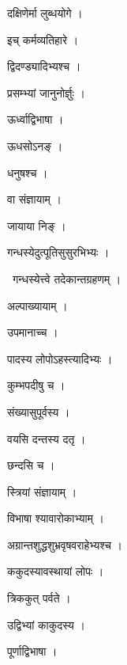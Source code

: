\documentclass[10pt, openany, oneside]{book}
\begin{document}
\noindent दक्षिणेर्मा लुब्धयोगे ।

\noindent इच् कर्मव्यतिहारे ।

\noindent द्विदण्ड्यादिभ्यश्च ।

\noindent प्रसम्भ्यां जानुनोर्ज्ञुः ।

\noindent ऊर्ध्वाद्विभाषा ।

\noindent ऊधसोऽनङ् ।

\noindent धनुषश्च ।

\noindent वा संज्ञायाम् ।

\noindent जायाया निङ् ।

\noindent गन्धस्येदुत्पूतिसुसुरभिभ्यः ।

\par\noindent\hspace{1.5em}{\vps वा॰}~{\qt गन्धस्येत्त्वे तदेकान्तग्रहणम् ।}

\noindent अल्पाख्यायाम् ।

\noindent उपमानाच्च ।

\noindent पादस्य लोपोऽहस्त्यादिभ्यः ।

\noindent कुम्भपदीषु च ।

\noindent संख्यासुपूर्वस्य ।

\noindent वयसि दन्तस्य दतृ ।

\noindent छन्दसि च ।

\noindent स्त्रियां संज्ञायाम् ।

\noindent विभाषा श्यावारोकाभ्याम् ।

\noindent अग्रान्तशुद्धशुभ्रवृषवराहेभ्यश्च ।

\noindent ककुदस्यावस्थायां लोपः ।

\noindent त्रिककुत् पर्वते ।

\noindent उद्विभ्यां काकुदस्य ।

\noindent पूर्णाद्विभाषा ।
\end{document}
